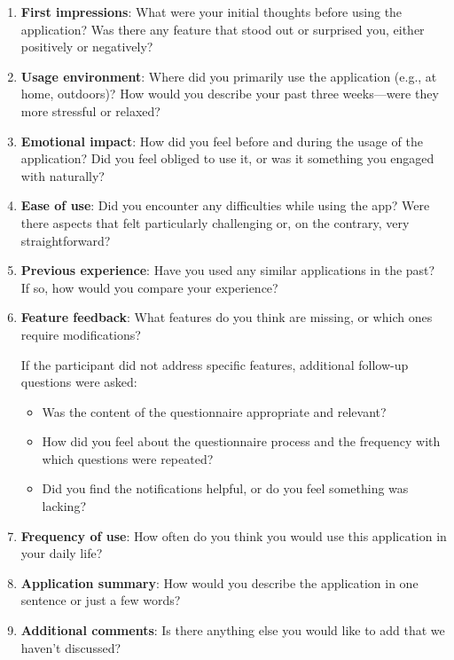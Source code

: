 \begin{enumerate}
    \item \textbf{First impressions}: What were your initial thoughts before using the application? Was there any feature that stood out or surprised you, either positively or negatively?
    \item \textbf{Usage environment}: Where did you primarily use the application (e.g., at home, outdoors)? How would you describe your past three weeks—were they more stressful or relaxed?
    \item \textbf{Emotional impact}: How did you feel before and during the usage of the application? Did you feel obliged to use it, or was it something you engaged with naturally?
    \item \textbf{Ease of use}: Did you encounter any difficulties while using the app? Were there aspects that felt particularly challenging or, on the contrary, very straightforward?
    \item \textbf{Previous experience}: Have you used any similar applications in the past? If so, how would you compare your experience?
    \item \textbf{Feature feedback}: What features do you think are missing, or which ones require modifications?
    
    \vspace{2mm} If the participant did not address specific features, additional follow-up questions were asked:

    \begin{itemize}
        \item Was the content of the questionnaire appropriate and relevant?
        \item How did you feel about the questionnaire process and the frequency with which questions were repeated?
        \item Did you find the notifications helpful, or do you feel something was lacking?
    \end{itemize}
    
    \item \textbf{Frequency of use}: How often do you think you would use this application in your daily life?
    \item \textbf{Application summary}: How would you describe the application in one sentence or just a few words?
    \item \textbf{Additional comments}: Is there anything else you would like to add that we haven’t discussed?
\end{enumerate}

